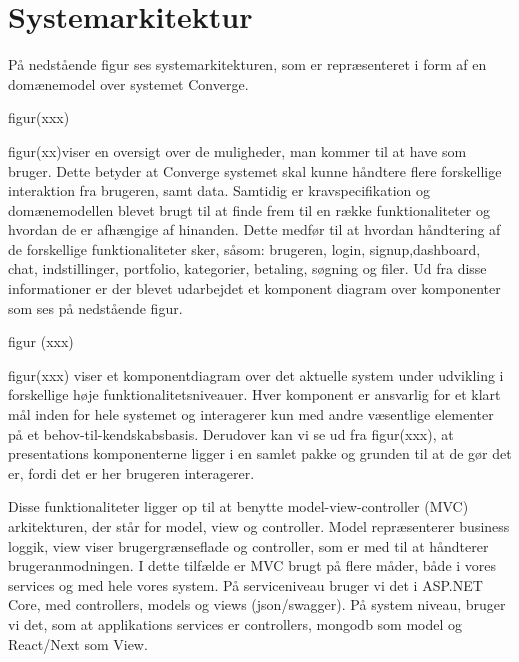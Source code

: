 
\section{Systemarkitektur}
På nedstående figur ses systemarkitekturen, som er repræsenteret i form af en domænemodel over systemet Converge.

figur(xxx)

figur(xx)viser en oversigt over de muligheder, man kommer til at have som bruger. Dette betyder at Converge systemet
skal kunne håndtere flere forskellige interaktion fra brugeren, samt data. Samtidig er kravspecifikation og domænemodellen
blevet brugt til at finde frem til en række funktionaliteter og hvordan de er afhængige af hinanden. Dette
medfør til at hvordan håndtering af de forskellige funktionaliteter sker, såsom: brugeren, login, signup,dashboard,
chat, indstillinger, portfolio, kategorier, betaling, søgning og filer. Ud fra disse informationer er der blevet udarbejdet
et komponent diagram over komponenter som ses på nedstående figur.

figur (xxx)

figur(xxx) viser et komponentdiagram over det aktuelle system under udvikling i forskellige høje funktionalitetsniveauer.
Hver komponent er ansvarlig for et klart mål inden for hele systemet og interagerer kun med andre væsentlige
elementer på et behov-til-kendskabsbasis. Derudover kan vi se ud fra figur(xxx), at presentations komponenterne
ligger i en samlet pakke og grunden til at de gør det er, fordi det er her brugeren interagerer.

Disse funktionaliteter ligger op til at benytte model-view-controller (MVC) arkitekturen, der står for model, view og
controller. Model repræsenterer business loggik, view viser brugergrænseflade og controller, som er med til at håndterer
brugeranmodningen. I dette tilfælde er MVC brugt på flere måder, både i vores services og med hele vores
system. På serviceniveau bruger vi det i ASP.NET Core, med controllers, models og views (json/swagger). På system
niveau, bruger vi det, som at applikations services er controllers, mongodb som model og React/Next som
View.




